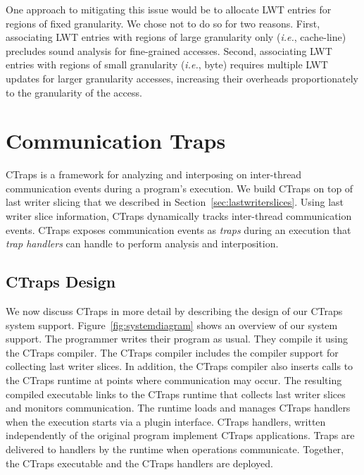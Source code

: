 \documentclass[preprint,10pt]{sigplanconf}
\newcommand{\ctraps}{CTraps\xspace}
\newcommand{\lwt}{LWT\xspace}
\begin{document}
One approach to mitigating this issue would be to allocate \lwt entries for
regions of fixed granularity.  We chose not to do so for two reasons.  First,
associating \lwt entries with regions of  large granularity only ({\em i.e.},
cache-line) precludes sound analysis for fine-grained accesses.  Second,
associating \lwt entries with regions of small granularity ({\em i.e.}, byte)
requires multiple \lwt updates for larger granularity accesses, increasing
their overheads proportionately to the granularity of the access.





\section{Communication Traps}
\label{sec:ctraps}

\ctraps is a framework for analyzing and interposing on inter-thread
communication events during a program's execution.  We build \ctraps on top of
last writer slicing that we described in Section~\ref{sec:lastwriterslices}.
Using last writer slice information, \ctraps dynamically tracks 
inter-thread communication events. \ctraps exposes communication
events as {\em traps} during an execution that {\em trap handlers} can handle
to perform analysis and interposition.  

\subsection{\ctraps Design}

We now discuss \ctraps in more detail by describing the design of our \ctraps
system support.  Figure~\ref{fig:systemdiagram} shows an overview of our system
support.  The programmer writes their program as usual.  They compile it using
the \ctraps compiler. The \ctraps compiler includes the compiler support for
collecting last writer slices.  In addition, the \ctraps compiler also inserts
calls to the \ctraps runtime at points where communication may occur.  The
resulting compiled executable links to the \ctraps runtime that collects last
writer slices and monitors communication.  The runtime loads and manages \ctraps
handlers when the execution starts via a plugin interface.  \ctraps handlers,
written independently of the original program implement \ctraps applications.
Traps are delivered to handlers by the runtime when operations communicate.
Together, the \ctraps executable and the \ctraps handlers are deployed.
\end{document}
